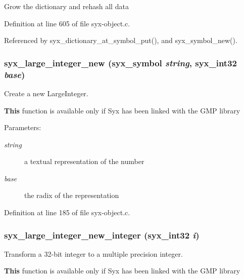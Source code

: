Grow the dictionary and rehash all data 

Definition at line 605 of file syx-object.c.

Referenced by syx\_\-dictionary\_\-at\_\-symbol\_\-put(), and syx\_\-symbol\_\-new().\hypertarget{syx-object_8c_a47aa6d16449ab82178626704b81aaf4}{
\subsubsection{ syx\_\-large\_\-integer\_\-new ({\bf syx\_\-symbol} {\em string}, \/  {\bf syx\_\-int32} {\em base})}}
\label{syx-object_8c_a47aa6d16449ab82178626704b81aaf4}


Create a new LargeInteger.

{\bf This} function is available only if Syx has been linked with the GMP library

\begin{Desc}
\item[Parameters:]
\begin{description}
\item[{\em string}]a textual representation of the number \item[{\em base}]the radix of the representation \end{description}
\end{Desc}


Definition at line 185 of file syx-object.c.\hypertarget{syx-object_8c_2df18ddb02364c9f0b6d2ed4533ab4c5}{
\subsubsection{ syx\_\-large\_\-integer\_\-new\_\-integer ({\bf syx\_\-int32} {\em i})}}
\label{syx-object_8c_2df18ddb02364c9f0b6d2ed4533ab4c5}


Transform a 32-bit integer to a multiple precision integer.

{\bf This} function is available only if Syx has been linked with the GMP library 

